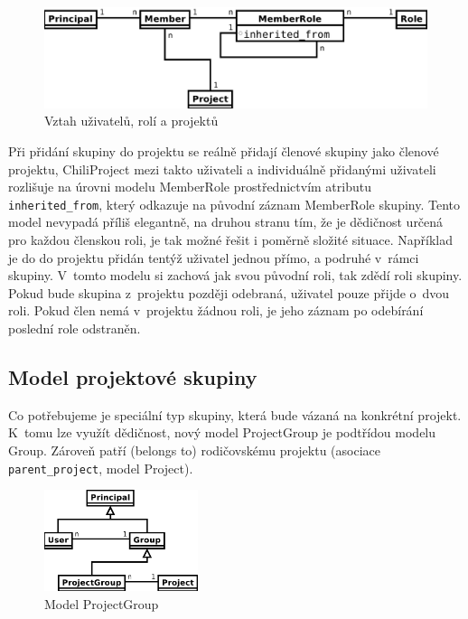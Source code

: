 \documentclass[thesis=B,czech]{FITthesis}[2012/05/02]
\begin{document}
\begin{figure}[htbp]
\centering
\includegraphics[width=1\textwidth]{group-er2.pdf}
\caption{Vztah uživatelů, rolí a projektů}
\end{figure}

Při přidání skupiny do projektu se reálně přidají členové skupiny jako
členové projektu, ChiliProject mezi takto  uživateli a
individuálně přidanými uživateli rozlišuje na úrovni modelu MemberRole
prostřednictvím atributu \lstinline!inherited_from!, který odkazuje na
původní záznam MemberRole skupiny. Tento model nevypadá příliš
elegantně, na druhou stranu tím, že je dědičnost určená pro každou
členskou roli, je tak možné řešit i poměrně složité situace. Například
je do do projektu přidán tentýž uživatel jednou přímo, a podruhé v~rámci
skupiny. V~tomto modelu si zachová jak svou původní roli, tak zdědí roli
skupiny. Pokud bude skupina z~projektu později odebraná, uživatel pouze
přijde o~dvou roli. Pokud člen nemá v~projektu žádnou roli, je jeho
záznam po odebírání poslední role odstraněn.

\subsection{Model projektové skupiny}

Co potřebujeme je speciální typ skupiny, která bude vázaná na konkrétní
projekt. K~tomu lze využít dědičnost, nový model ProjectGroup je
podtřídou modelu Group. Zároveň patří (belongs to) rodičovskému projektu
(asociace \lstinline!parent_project!, model Project).

\begin{figure}[bp]
\centering
\includegraphics[width=0.4\textwidth]{group-er3.pdf}
\caption{Model ProjectGroup}
\end{figure}
\end{document}
